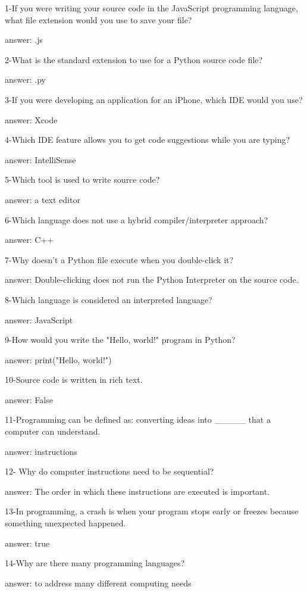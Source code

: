 1-If you were writing your source code in the JavaScript programming language, what file extension would you use to save your file?

answer: .js

2-What is the standard extension to use for a Python source code file?

answer: .py

3-If you were developing an application for an iPhone, which IDE would you use?

answer: Xcode

4-Which IDE feature allows you to get code suggestions while you are typing?

answer: IntelliSense

5-Which tool is used to write source code?

answer: a text editor

6-Which language does not use a hybrid compiler/interpreter approach?

answer: C++

7-Why doesn't a Python file execute when you double-click it?

answer: Double-clicking does not run the Python Interpreter on the source code.

8-Which language is considered an interpreted language?

answer: JavaScript

9-How would you write the "Hello, world!" program in Python?

answer: print("Hello, world!")

10-Source code is written in rich text.

answer: False 

11-Programming can be defined as: converting ideas into _____ that a computer can understand.

answer: instructions

12- Why do computer instructions need to be sequential?

answer: The order in which these instructions are executed is important.

13-In programming, a crash is when your program stops early or freezes because something unexpected happened.

answer: true 

14-Why are there many programming languages?

answer: to address many different computing needs

